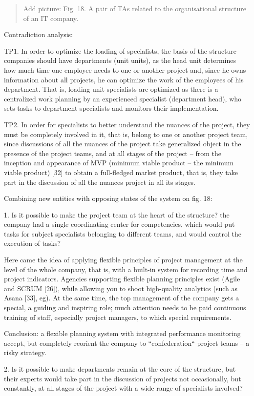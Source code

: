 \documentclass[11pt,a4paper]{book}
\newcommand{\addpicture}[1]{
  \begin{quote} Add picture: #1\end{quote}
}
\begin{document}
\addpicture{Fig. 18. A pair of TAs related to the organisational structure of
  an IT company.}

Contradiction analysis:

TP1. In order to optimize the loading of specialists, the basis of the
structure companies should have departments (unit units), as the head unit
determines how much time one employee needs to one or another project and,
since he owns information about all projects, he can optimize the work of the
employees of his department. That is, loading unit specialists are optimized
as there is a centralized work planning by an experienced specialist
(department head), who sets tasks to department specialists and monitors their
implementation.

TP2. In order for specialists to better understand the nuances of the project,
they must be completely involved in it, that is, belong to one or another
project team, since discussions of all the nuances of the project take generalized object
in the presence of the project teams, and at all stages of the project -- from
the inception and appearance of MVP (minimum viable product -- the minimum
viable product) [32] to obtain a full-fledged market product, that is, they
take part in the discussion of all the nuances project in all its stages.

Combining new entities with opposing states of the system on fig. 18:

1. Is it possible to make the project team at the heart of the structure?  the
company had a single coordinating center for competencies, which would put
tasks for subject specialists belonging to different teams, and would control
the execution of tasks?

Here came the idea of applying flexible principles of project management at
the level of the whole company, that is, with a built-in system for recording
time and project indicators.  Agencies supporting flexible planning principles
exist (Agile and SCRUM [26]), while allowing you to shoot high-quality
analytics (such as Asana [33], eg). At the same time, the top management of
the company gets a special, a guiding and inspiring role; much attention needs
to be paid continuous training of staff, especially project managers, to which
special requirements.

Conclusion: a flexible planning system with integrated performance monitoring
accept, but completely reorient the company to “confederation“ project teams
-- a risky strategy.

2. Is it possible to make departments remain at the core of the structure, but
their experts would take part in the discussion of projects not occasionally,
but constantly, at all stages of the project with a wide range of specialists
involved?
\end{document}
